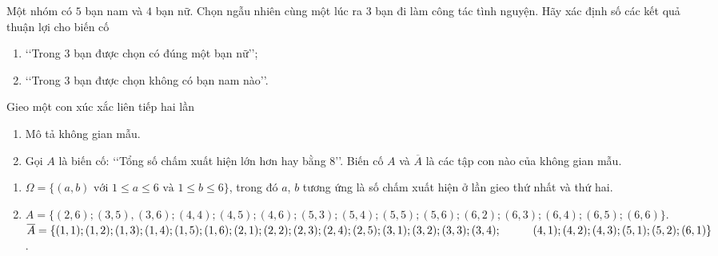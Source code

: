 \begin{vd}%
	Một nhóm có $ 5 $ bạn nam và $ 4 $ bạn nữ. Chọn ngẫu nhiên cùng một lúc ra $ 3 $ bạn đi làm công tác tình nguyện. Hãy xác định số các kết quả thuận lợi cho biến cố
	\begin{enumerate}
		\item \lq\lq  Trong $ 3 $ bạn được chọn có đúng một bạn nữ\rq\rq;
		\item \lq\lq  Trong $ 3 $ bạn được chọn không có bạn nam nào\rq\rq.
	\end{enumerate}
\end{vd}
\baitaptl
\begin{bt}%
	Gieo một con xúc xắc liên tiếp hai lần
	\begin{enumerate}
		\item Mô tả không gian mẫu.
		\item Gọi $A$ là biến cố: \lq\lq  Tổng số chấm xuất hiện lớn hơn hay bằng $8$\rq\rq. Biến cố $A$ và $\overline{A}$ là các tập con nào của không gian mẫu.
	\end{enumerate}
	\loigiai
	{
		\begin{enumerate}
			\item $\Omega= \{(a, b) \text{ với } 1\le a \le 6 \text{ và } 1\le b\le 6\}$, trong đó $a$, $b$ tương ứng là số chấm xuất hiện ở lần gieo thứ nhất và thứ hai.
			\item $A= \{(2,6); (3,5), (3,6); (4,4); (4,5); (4,6); (5,3); (5,4); (5,5); (5,6); (6,2); (6,3); (6,4); (6,5); (6,6)\}$.\\
			$\overline{A}= \{(1,1); (1,2); (1,3); (1,4); (1,5); (1,6); (2,1); (2,2); (2,3); (2,4); (2,5); (3,1); (3,2); (3,3); (3,4);\\
			\hspace*{1cm} (4,1); (4,2); (4,3); (5,1); (5,2); (6,1)\}$.
		\end{enumerate}
	}
\end{bt}

